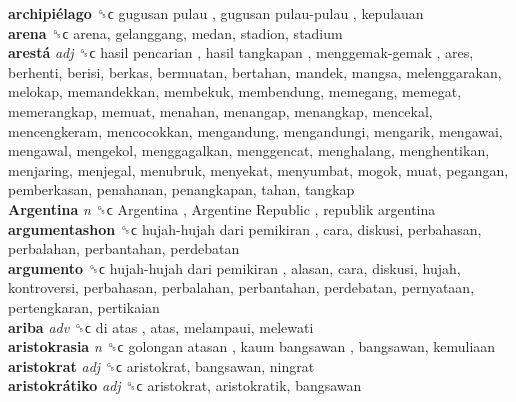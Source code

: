 \textbf{archipiélago} ␝ϲ   gugusan pulau ,  gugusan pulau-pulau , kepulauan  \\
\textbf{arena} ␝ϲ  arena, gelanggang, medan, stadion, stadium  \\
\textbf{arestá} \emph{adj}  ␝ϲ   hasil pencarian ,  hasil tangkapan ,  menggemak-gemak , ares, berhenti, berisi, berkas, bermuatan, bertahan, mandek, mangsa, melenggarakan, melokap, memandekkan, membekuk, membendung, memegang, memegat, memerangkap, memuat, menahan, menangap, menangkap, mencekal, mencengkeram, mencocokkan, mengandung, mengandungi, mengarik, mengawai, mengawal, mengekol, menggagalkan, menggencat, menghalang, menghentikan, menjaring, menjegal, menubruk, menyekat, menyumbat, mogok, muat, pegangan, pemberkasan, penahanan, penangkapan, tahan, tangkap  \\
\textbf{Argentina} \emph{n}  ␝ϲ   Argentina ,  Argentine Republic ,  republik argentina   \\
\textbf{argumentashon} ␝ϲ   hujah-hujah dari pemikiran , cara, diskusi, perbahasan, perbalahan, perbantahan, perdebatan  \\
\textbf{argumento} ␝ϲ   hujah-hujah dari pemikiran , alasan, cara, diskusi, hujah, kontroversi, perbahasan, perbalahan, perbantahan, perdebatan, pernyataan, pertengkaran, pertikaian  \\
\textbf{ariba} \emph{adv}  ␝ϲ   di atas , atas, melampaui, melewati  \\
\textbf{aristokrasia} \emph{n}  ␝ϲ   golongan atasan ,  kaum bangsawan , bangsawan, kemuliaan  \\
\textbf{aristokrat} \emph{adj}  ␝ϲ  aristokrat, bangsawan, ningrat  \\
\textbf{aristokrátiko} \emph{adj}  ␝ϲ  aristokrat, aristokratik, bangsawan  \\
